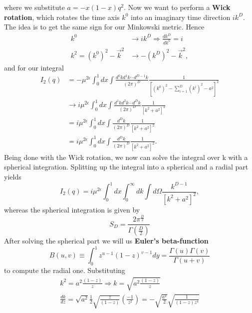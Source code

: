 	where we substitute $a = -x(1-x)q^2$. Now we want to perform a \textbf{Wick rotation}, which rotates the time axis $k^0$ into an imaginary time direction $ik^D$. The idea is to get the same sign for our Minkowski metric. Hence 
	\begin{equation}
		\begin{split}	
			k^0 &\rightarrow ik^D \Rightarrow \frac{dk^D}{dk^0} = i \\ 
			k^2 = (k^0)^2 - \vec k^2 &\rightarrow -(k^D)^2 - \vec k^2,
		\end{split}
	\end{equation}
	and for our integral
	\begin{equation}
		\begin{split}
			I_2(q) &= - \mu^{2\epsilon} \int^1_0 dx \int \frac{d^0k d^1k \cdots d^{D-1}k}{(2\pi)^D} \frac{1}{[(k^0)^2 - \sum_{i=1}^{D}(k^i)^2 - a^2]^2} \\
			&\rightarrow i\mu^{2\epsilon} \int^1_0 dx\int \frac{d^1kd^2k \cdots d^Dk}{(2\pi)^D} \frac{1}{[k^2+a^2]^2} \\
			&= i \mu^{2\epsilon} \int^1_0 dx \int \frac{d^Dk}{(2\pi)^D}\frac{1}{[k^2+a^2]^2} \\
			&= i \mu^{2\epsilon} \int^1_0 dx \int \frac{d^Dk}{(2\pi)^D}\frac{1}{[k^2+a^2]^2}.
		\end{split}
	\end{equation}
	Being done with the Wick rotation, we now can solve the integral over k with a spherical integration. Splitting up the integral into a spherical and a radial part yields 
	\begin{equation}	
		I_2(q) = i\mu^{2\epsilon} \int_0^1 dx \int_0^\infty dk \int d\Omega \frac{k^{D-1}}{[k^2+a^2]^2},
	\end{equation}
	whereas the spherical integration is given by
	\begin{equation}
		S_D = \frac{2 \pi^{\frac{D}{2}}}{\Gamma(\frac{D}{2})} 
	\end{equation}
	After solving the spherical part we will us \textbf{Euler's beta-function} 
	\begin{equation}
		B(u,v) \equiv \int_0^1 z^{u-1} (1-z)^{v-1} dy = \frac{\Gamma(u) \Gamma(v)}{\Gamma(u+v)}
	\end{equation}
	to compute the radial one. Substituting
	\begin{equation}
		\begin{split}
			k^2 = a^2 \frac{(1-z)}{z} \Rightarrow k = \sqrt{a^2 \frac{(1-z)}{z}} \\
			\frac{dk}{dz} = \sqrt{a^2} \frac{1}{2} \sqrt{\frac{z}{(1-z)}}\left(\frac{-1}{z^2}\right) = - \sqrt{\frac{a^2}{2}} \sqrt{\frac{1}{(1-z)z^4}}
		\end{split}
	\end{equation}
